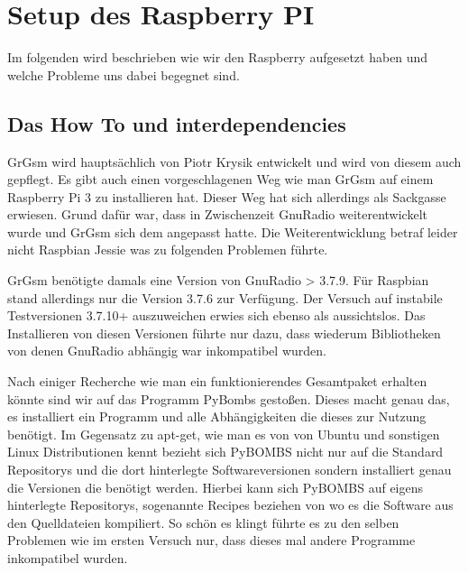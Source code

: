 %
%
\chapter{Setup des Raspberry PI}
Im folgenden wird beschrieben wie wir den Raspberry aufgesetzt haben und welche Probleme uns dabei begegnet sind.
\section{Das How To und interdependencies}

GrGsm wird hauptsächlich von Piotr Krysik entwickelt und wird von diesem auch gepflegt. Es gibt auch einen vorgeschlagenen Weg wie man GrGsm auf einem Raspberry Pi 3 zu installieren hat. Dieser Weg hat sich allerdings als Sackgasse erwiesen. Grund dafür war, dass in Zwischenzeit GnuRadio weiterentwickelt wurde und GrGsm sich dem angepasst hatte. Die Weiterentwicklung betraf leider nicht Raspbian Jessie was zu folgenden Problemen führte.

GrGsm benötigte damals eine Version von GnuRadio > 3.7.9. Für Raspbian stand allerdings nur die Version 3.7.6 zur Verfügung. Der Versuch auf instabile Testversionen 3.7.10+ auszuweichen erwies sich ebenso als aussichtslos. Das Installieren von diesen Versionen führte nur dazu, dass wiederum Bibliotheken von denen GnuRadio abhängig war inkompatibel wurden. 

Nach einiger Recherche wie man ein funktionierendes Gesamtpaket erhalten könnte sind wir auf das Programm PyBombs gestoßen. Dieses macht genau das, es installiert ein Programm und alle Abhängigkeiten die dieses zur Nutzung benötigt. Im Gegensatz zu apt-get, wie man es von von Ubuntu und sonstigen Linux Distributionen kennt bezieht sich PyBOMBS nicht nur auf die Standard Repositorys und die dort hinterlegte Softwareversionen sondern installiert genau die Versionen die benötigt werden. Hierbei kann sich PyBOMBS auf eigens hinterlegte Repositorys, sogenannte Recipes beziehen von wo es die Software aus den Quelldateien kompiliert. 
So schön es klingt führte es zu den selben Problemen wie im ersten Versuch nur, dass dieses mal andere Programme inkompatibel wurden.


